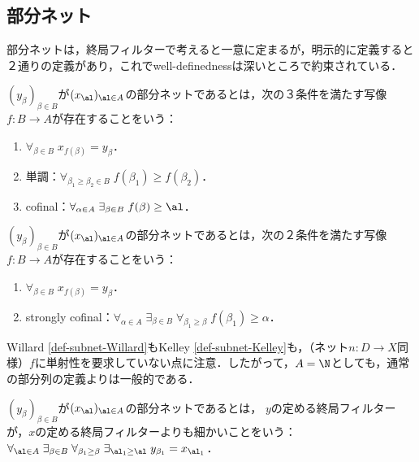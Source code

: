 \documentclass[uplatex,dvipdfmx]{jsreport}
\begin{document}
\subsection{部分ネット}

\begin{tcolorbox}[colframe=ForestGreen, colback=ForestGreen!10!white,breakable,colbacktitle=ForestGreen!40!white,coltitle=black,fonttitle=\bfseries\sffamily,
title=]
    部分ネットは，終局フィルターで考えると一意に定まるが，明示的に定義すると２通りの定義があり，これでwell-definednessは深いところで約束されている．
\end{tcolorbox}

\begin{definition}[Willard 1970]\label{def-subnet-Willard}
    $(y_\beta)_{\beta\in B}$が$(x_\al)_{\al\in A}$の部分ネットであるとは，次の３条件を満たす写像$f:B\to A$が存在することをいう：
    \begin{enumerate}
        \item $\forall_{\beta\in B}\;x_{f(\beta)}=y_\beta$．
        \item 単調：$\forall_{\beta_1\ge\beta_2\in B}\;f(\beta_1)\ge f(\beta_2)$．
        \item cofinal：$\forall_{\alpha\in A}\;\exists_{\beta\in B}\;f(\beta)\ge\al$．
    \end{enumerate}
\end{definition}

\begin{definition}[Kelley 1955]\label{def-subnet-Kelley}
    $(y_\beta)_{\beta\in B}$が$(x_\al)_{\al\in A}$の部分ネットであるとは，次の２条件を満たす写像$f:B\to A$が存在することをいう：
    \begin{enumerate}
        \item $\forall_{\beta\in B}\;x_{f(\beta)}=y_\beta$．
        \item strongly cofinal：$\forall_{\alpha\in A}\;\exists_{\beta\in B}\;\forall_{\beta_1\ge\beta}\;f(\beta_1)\ge\alpha$．
    \end{enumerate}
\end{definition}

\begin{remark}
    Willard \ref{def-subnet-Willard}もKelley \ref{def-subnet-Kelley}も，（ネット$n:D\to X$同様）$f$に単射性を要求していない点に注意．したがって，$A=\N$としても，通常の部分列の定義よりは一般的である．
\end{remark}

\begin{definition}\label{def-subnet-Smiley}
    $(y_\beta)_{\beta\in B}$が$(x_\al)_{\al\in A}$の部分ネットであるとは，
    $y$の定める終局フィルターが，$x$の定める終局フィルターよりも細かいことをいう：$\forall_{\al\in A}\;\exists_{\beta\in B}\;\forall_{\beta_1\ge\beta}\;\exists_{\al_1\ge\al}\; y_{\beta_1}=x_{\al_1}$．
\end{definition}
\end{document}
